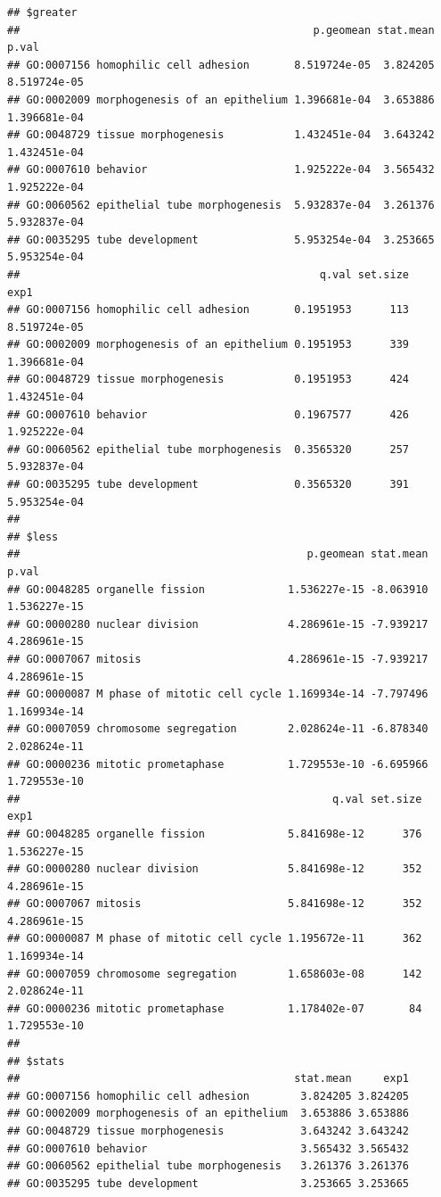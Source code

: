 \documentclass[
]{article}
\begin{document}
\begin{verbatim}
## $greater
##                                              p.geomean stat.mean        p.val
## GO:0007156 homophilic cell adhesion       8.519724e-05  3.824205 8.519724e-05
## GO:0002009 morphogenesis of an epithelium 1.396681e-04  3.653886 1.396681e-04
## GO:0048729 tissue morphogenesis           1.432451e-04  3.643242 1.432451e-04
## GO:0007610 behavior                       1.925222e-04  3.565432 1.925222e-04
## GO:0060562 epithelial tube morphogenesis  5.932837e-04  3.261376 5.932837e-04
## GO:0035295 tube development               5.953254e-04  3.253665 5.953254e-04
##                                               q.val set.size         exp1
## GO:0007156 homophilic cell adhesion       0.1951953      113 8.519724e-05
## GO:0002009 morphogenesis of an epithelium 0.1951953      339 1.396681e-04
## GO:0048729 tissue morphogenesis           0.1951953      424 1.432451e-04
## GO:0007610 behavior                       0.1967577      426 1.925222e-04
## GO:0060562 epithelial tube morphogenesis  0.3565320      257 5.932837e-04
## GO:0035295 tube development               0.3565320      391 5.953254e-04
## 
## $less
##                                             p.geomean stat.mean        p.val
## GO:0048285 organelle fission             1.536227e-15 -8.063910 1.536227e-15
## GO:0000280 nuclear division              4.286961e-15 -7.939217 4.286961e-15
## GO:0007067 mitosis                       4.286961e-15 -7.939217 4.286961e-15
## GO:0000087 M phase of mitotic cell cycle 1.169934e-14 -7.797496 1.169934e-14
## GO:0007059 chromosome segregation        2.028624e-11 -6.878340 2.028624e-11
## GO:0000236 mitotic prometaphase          1.729553e-10 -6.695966 1.729553e-10
##                                                 q.val set.size         exp1
## GO:0048285 organelle fission             5.841698e-12      376 1.536227e-15
## GO:0000280 nuclear division              5.841698e-12      352 4.286961e-15
## GO:0007067 mitosis                       5.841698e-12      352 4.286961e-15
## GO:0000087 M phase of mitotic cell cycle 1.195672e-11      362 1.169934e-14
## GO:0007059 chromosome segregation        1.658603e-08      142 2.028624e-11
## GO:0000236 mitotic prometaphase          1.178402e-07       84 1.729553e-10
## 
## $stats
##                                           stat.mean     exp1
## GO:0007156 homophilic cell adhesion        3.824205 3.824205
## GO:0002009 morphogenesis of an epithelium  3.653886 3.653886
## GO:0048729 tissue morphogenesis            3.643242 3.643242
## GO:0007610 behavior                        3.565432 3.565432
## GO:0060562 epithelial tube morphogenesis   3.261376 3.261376
## GO:0035295 tube development                3.253665 3.253665
\end{verbatim}
\end{document}
